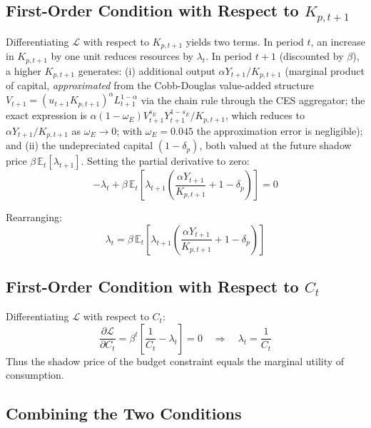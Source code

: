 \documentclass[12pt, a4paper]{article}
\begin{document}
\subsection*{First-Order Condition with Respect to $K_{p,t+1}$}

Differentiating $\mathcal{L}$ with respect to $K_{p,t+1}$ yields two terms. In period $t$, an increase in $K_{p,t+1}$ by one unit reduces resources by $\lambda_t$. In period $t+1$ (discounted by $\beta$), a higher $K_{p,t+1}$ generates: (i) additional output $\alpha Y_{t+1}/K_{p,t+1}$ (marginal product of capital, \textit{approximated} from the Cobb-Douglas value-added structure $V_{t+1} = (u_{t+1}K_{p,t+1})^\alpha L_{t+1}^{1-\alpha}$ via the chain rule through the CES aggregator; the exact expression is $\alpha(1-\omega_E)V_{t+1}^{s_E}Y_{t+1}^{1-s_E}/K_{p,t+1}$, which reduces to $\alpha Y_{t+1}/K_{p,t+1}$ as $\omega_E \to 0$; with $\omega_E = 0.045$ the approximation error is negligible); and (ii) the undepreciated capital $(1-\delta_p)$, both valued at the future shadow price $\beta\,\mathbb{E}_t[\lambda_{t+1}]$. Setting the partial derivative to zero:
\begin{equation*}
-\lambda_t + \beta\,\mathbb{E}_t\!\left[\lambda_{t+1}
\left(\frac{\alpha Y_{t+1}}{K_{p,t+1}} + 1 - \delta_p\right)\right] = 0
\end{equation*}

Rearranging:
\begin{equation*}
\lambda_t = \beta\,\mathbb{E}_t\!\left[\lambda_{t+1}
\left(\frac{\alpha Y_{t+1}}{K_{p,t+1}} + 1 - \delta_p\right)\right]
\tag{A1}\label{eq:foc_k}
\end{equation*}

\subsection*{First-Order Condition with Respect to $C_t$}

Differentiating $\mathcal{L}$ with respect to $C_t$:
\begin{equation*}
\frac{\partial \mathcal{L}}{\partial C_t} = \beta^t\left[\frac{1}{C_t} - \lambda_t\right] = 0
\quad \Longrightarrow \quad
\lambda_t = \frac{1}{C_t}
\tag{A2}\label{eq:foc_c}
\end{equation*}
Thus the shadow price of the budget constraint equals the marginal utility of consumption.

\subsection*{Combining the Two Conditions}
\end{document}
